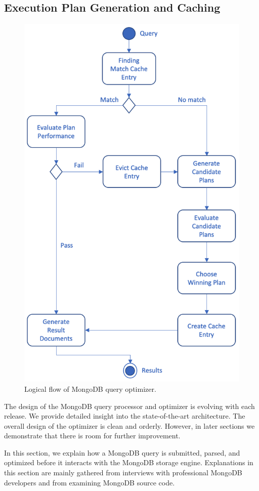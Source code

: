 \subsection{Execution Plan Generation and Caching}

\begin{figure}[tb]
  \centering
  \includegraphics[width=0.75\linewidth]{images/background/query_planner_before.png}
  \caption{Logical flow of MongoDB query optimizer.}
  \label{figure:logicflow}
\end{figure}

The design of the MongoDB query processor and optimizer is evolving with each release. We provide detailed insight into the state-of-the-art architecture. The overall design of the optimizer is clean and orderly. However, in later sections we demonstrate that there is room for further improvement.

In this section, we explain how a MongoDB query is submitted, parsed, and optimized before it interacts with the MongoDB storage engine. Explanations in this section are mainly gathered from interviews with professional MongoDB developers and from examining MongoDB source code.

